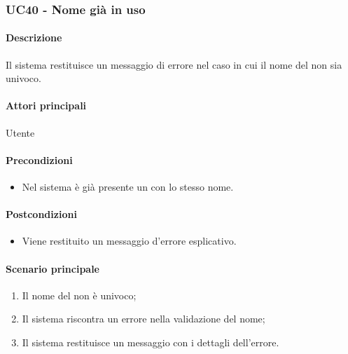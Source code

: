 \subsubsection{UC40 - Nome già in uso}\label{UC40}
\paragraph*{Descrizione}
Il sistema restituisce un messaggio di errore nel caso in cui il nome del  non sia univoco.

\paragraph*{Attori principali}
Utente

\paragraph*{Precondizioni}
\begin{itemize}
  \item Nel sistema è già presente un  con lo stesso nome.
\end{itemize}

\paragraph*{Postcondizioni}
\begin{itemize}
  \item Viene restituito un messaggio d'errore esplicativo.
\end{itemize}

\paragraph*{Scenario principale}
\begin{enumerate}
  \item Il nome del  non è univoco;
  \item Il sistema riscontra un errore nella validazione del nome;
  \item Il sistema restituisce un messaggio con i dettagli dell'errore.  
\end{enumerate}
